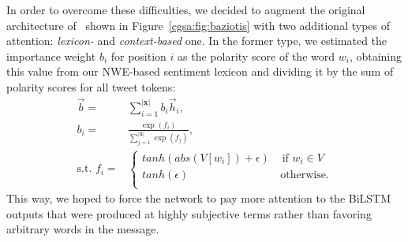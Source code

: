 In order to overcome these difficulties, we decided to augment the
original architecture of~\citet{Baziotis:17} shown in
Figure~\ref{cgsa:fig:baziotis} with two additional types of attention:
\emph{lexicon-} and \emph{context-based} one.  In the former type, we
estimated the importance weight $b_i$ for position $i$ as the polarity
score of the word $w_i$, obtaining this value from our NWE-based
sentiment lexicon and dividing it by the sum of polarity scores for
all tweet tokens:
\begin{align*}
  \vec{b} =& \sum_{i=1}^{|\mathbf{x}|}b_i\vec{h}_i,\\
  b_i =& \frac{\exp(f_i)}{\sum_{j=1}^{|\mathbf{x}|}\exp(f_j)},\\
  \mbox{s.t. }f_i
  =& \left\{
  \begin{array}{ll}
    tanh(abs(V[{w_i}]) + \epsilon) & \textrm{ if } w_i\in V\\
    tanh(\epsilon) & \, \textrm{otherwise.} \\
  \end{array}
  \right .
\end{align*}\label{cgsa:eq:lba}%
This way, we hoped to force the network to pay more attention to the
BiLSTM outputs that were produced at highly subjective terms rather
than favoring arbitrary words in the message.

